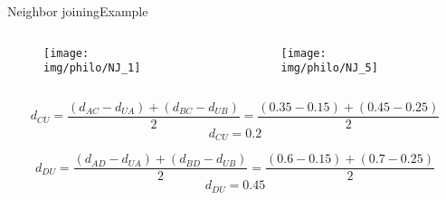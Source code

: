 \documentclass[10pt]{beamer}
\newcommand{\1}{
	\setbeamertemplate{background}{
		\texttt{[image: img/1]}
		\tikz[overlay] \fill[fill opacity=0.75,fill=white] (0,0) rectangle (-\paperwidth,\paperheight);
	}
}
\begin{document}
\begin{frame}{Neighbor joining}{Example}
	\begin{columns}
		\begin{column}{0.48\textwidth}
			\begin{figure}
				\texttt{[image: img/philo/NJ\_1]}
			\end{figure}
		\end{column}
		\begin{column}{0.48\textwidth}	
			
			\begin{figure}
				\texttt{[image: img/philo/NJ\_5]}
			\end{figure}
		
			
		\end{column}
	\end{columns}

	\begin{equation*}
	d_{CU} = \frac{ (d_{AC} - d_{UA} ) + (d_{BC} - d_{UB} )}{2} 
	=  \frac{ (0.35 - 0.15) + (0.45 - 0.25)} {2} 
	\end{equation*}
	\begin{equation*}		
	d_{CU} = 0.2 
	\end{equation*}
	
	\begin{equation*}
	d_{DU} = \frac{ (d_{AD} - d_{UA} ) + (d_{BD} - d_{UB} )}{2} 
	=  \frac{ (0.6 - 0.15) + (0.7 - 0.25)} {2} 
	\end{equation*}
	\begin{equation*}		
	d_{DU} = 0.45 
	\end{equation*}
\end{frame}
\end{document}
